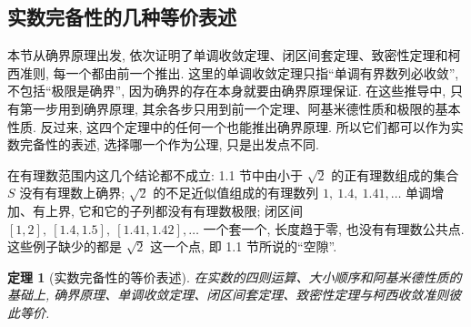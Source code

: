 \documentclass[UTF8,openany]{ctexbook}
\theoremstyle{chinesetextbook}
\newtheorem{theorem}{定理}[section]
\begin{document}
\subsection{实数完备性的几种等价表述}
本节从确界原理出发, 依次证明了单调收敛定理、闭区间套定理、致密性定理和柯西准则, 每一个都由前一个推出. 这里的单调收敛定理只指“单调有界数列必收敛”, 不包括“极限是确界”, 因为确界的存在本身就要由确界原理保证. 在这些推导中, 只有第一步用到确界原理, 其余各步只用到前一个定理、阿基米德性质和极限的基本性质. 反过来, 这四个定理中的任何一个也能推出确界原理. 所以它们都可以作为实数完备性的表述, 选择哪一个作为公理, 只是出发点不同.

在有理数范围内这几个结论都不成立: 1.1 节中由小于 $\sqrt2$ 的正有理数组成的集合 $S$ 没有有理数上确界; $\sqrt2$ 的不足近似值组成的有理数列 $1,\ 1.4,\ 1.41,\ldots$ 单调增加、有上界, 它和它的子列都没有有理数极限; 闭区间 $[1,2],\ [1.4,1.5],\ [1.41,1.42],\ldots$ 一个套一个, 长度趋于零, 也没有有理数公共点. 这些例子缺少的都是 $\sqrt2$ 这一个点, 即 1.1 节所说的“空隙”.
\begin{theorem}[实数完备性的等价表述]
在实数的四则运算、大小顺序和阿基米德性质的基础上, 确界原理、单调收敛定理、闭区间套定理、致密性定理与柯西收敛准则彼此等价.
\end{theorem}
\end{document}

